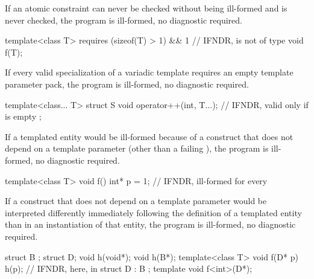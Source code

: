 
\pnum
If an atomic constraint can never be checked
without being ill-formed and is never checked,
the program is ill-formed, no diagnostic required.

\pnum
\begin{example}
\begin{codeblock}
template<class T>
  requires (sizeof(T) > 1) && 1     // IFNDR,  is not of type 
void f(T);
\end{codeblock}
\end{example}


\pnum
If every valid specialization of a variadic template
requires an empty template parameter pack,
the program is ill-formed, no diagnostic required.

\pnum
\begin{example}
\begin{codeblock}
template<class... T> struct S {
  void operator++(int, T...);       // IFNDR, valid only if  is empty
};
\end{codeblock}
\end{example}


\pnum
If a templated entity would be ill-formed
because of a construct that does not depend on a template parameter
(other than a failing ),
the program is ill-formed, no diagnostic required.

\pnum
\begin{example}
\begin{codeblock}
template<class T> void f() {
  int* p = 1;   // IFNDR, ill-formed for every 
}
\end{codeblock}
\end{example}


\pnum
If a construct that does not depend on a template parameter
would be interpreted differently
immediately following the definition of a templated entity
than in an instantiation of that entity,
the program is ill-formed, no diagnostic required.

\pnum
\begin{example}
\begin{codeblock}
struct B {};
struct D;
void h(void*);
void h(B*);
template<class T> void f(D* p) {
  h(p);         // IFNDR,  here,  in 
}
struct D : B {};
template void f<int>(D*);
\end{codeblock}
\end{example}

